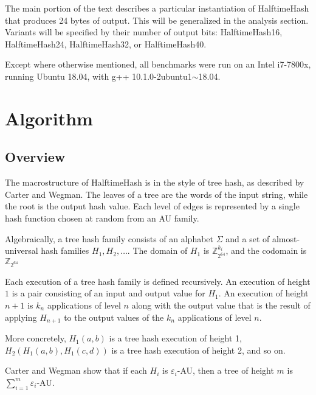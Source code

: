 \documentclass[sigconf, nonacm]{acmart}
\newcommand{\ints}{\mathbb{Z}}
\begin{document}
The main portion of the text describes a particular instantiation of HalftimeHash that produces 24 bytes of output.
This will be generalized in the analysis section.
Variants will be specified by their number of output bits: HalftimeHash16, HalftimeHash24, HalftimeHash32, or HalftimeHash40.

Except where otherwise mentioned, all benchmarks were run on an Intel i7-7800x, running Ubuntu 18.04, with g++ 10.1.0-2ubuntu1$\sim{}$18.04.

\section{Algorithm}
\label{algo}

\subsection{Overview}

The macrostructure of HalftimeHash is in the style of tree hash, as described by Carter and Wegman. \cite{carter-wegman-79}
The leaves of a tree are the words of the input string, while the root is the output hash value.
Each level of edges is represented by a single hash function chosen at random from an AU family.

Algebraically, a tree hash family consists of an alphabet $\Sigma$ and a set of almost-universal hash families $H_1, H_2, \dots$.
The domain of $H_1$ is $\ints_{2^{64}}^{k_i}$, and the codomain is $\ints_{2^{64}}$

Each execution of a tree hash family is defined recursively.
An execution of height $1$ is a pair consisting of an input and output value for $H_1$.
An execution of height $n+1$ is $k_n$ applications of level $n$ along with the output value that is the result of applying $H_{n+1}$ to the output values of the $k_n$ applications of level $n$.

More concretely, $H_1(a,b)$ is a tree hash execution of height 1, $H_2(H_1(a,b), H_1(c,d))$ is a tree hash execution of height 2, and so on.

Carter and Wegman show that if each $H_i$ is $\varepsilon_i$-AU, then a tree of height $m$ is $\sum_{i=1}^m \varepsilon_i$-AU.
\end{document}
